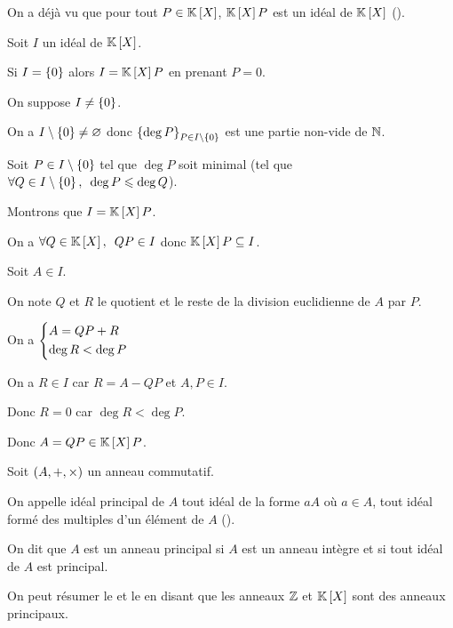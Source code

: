\begin{dem}
\increc

On a déjà vu que pour tout \(P\in\poly\), \(\poly P\) est un idéal de \(\poly\) ().

\incdir

Soit \(I\) un idéal de \(\poly\).

Si \(I=\left\lbrace0\right\rbrace\) alors \(I=\poly P\) en prenant \(P=0\).

On suppose \(I\not=\left\lbrace0\right\rbrace\).

On a \(I\setminus\left\lbrace0\right\rbrace\not=\varnothing\) donc \(\left\lbrace\deg P\right\rbrace_{P\in I\setminus\left\lbrace0\right\rbrace}\) est une partie non-vide de \(\mathbb{N}\).

Soit \(P\in I\setminus\left\lbrace0\right\rbrace\) tel que \(\deg P\) soit minimal (\cad tel que \(\quantifs{\forall Q\in I\excluant\accol{0}}\deg P\leq\deg Q\)).

Montrons que \(I=\poly P\).

\increc On a \(\quantifs{\forall Q\in\poly}QP\in I\) donc \(\poly P\subset I\).

\incdir

Soit \(A\in I\).

On note \(Q\) et \(R\) le quotient et le reste de la division euclidienne de \(A\) par \(P\).

On a \(\begin{dcases}A=QP+R \\ \deg R<\deg P\end{dcases}\)

On a \(R\in I\) car \(R=A-QP\) et \(A,P\in I\).

Donc \(R=0\) car \(\deg R<\deg P\).

Donc \(A=QP\in\poly P\).
\end{dem}

\begin{rem}
Soit \(\anneau{A}\) un anneau commutatif.

On appelle idéal principal de \(A\) tout idéal de la forme \(aA\) où \(a\in A\), \cad tout idéal formé des multiples d'un élément de \(A\) (\cf {}).

On dit que \(A\) est un anneau principal si \(A\) est un anneau intègre et si tout idéal de \(A\) est principal.

On peut résumer le  et le  en disant que les anneaux \(\mathbb{Z}\) et \(\poly\) sont des anneaux principaux.
\end{rem}


